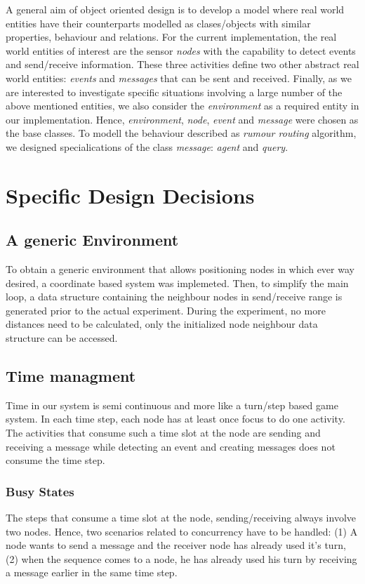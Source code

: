 \documentclass[a4paper,11pt,twoside]{article}
\begin{document}
A general aim of object oriented design is to develop a model where
real world entities have their counterparts modelled as clases/objects
with similar properties, behaviour and relations. For the current
implementation, the real world entities of interest are the sensor
\textit{nodes} with the capability to detect events and send/receive
information. These three activities define two other abstract real
world entities: \textit{events} and \textit{messages} that can be sent
and received. Finally, as we are interested to investigate specific
situations involving a large number of the above mentioned entities,
we also consider the \textit{environment} as a required entity in our
implementation. Hence, \textit{environment}, \textit{node},
\textit{event} and \textit{message} were chosen as the base
classes. To modell the behaviour described as \textit{rumour routing} algorithm,
we designed specialications of the class \textit{message}:
\textit{agent} and \textit{query}.

\section{Specific Design Decisions}
\subsection{A generic Environment}
To obtain a generic environment that allows positioning nodes in which
ever way desired, a coordinate based system was implemeted. Then, to
simplify the main loop, a data structure containing the
neighbour nodes in send/receive range is generated prior to the actual
experiment. During the experiment, no more distances need to be
calculated, only the initialized node neighbour data structure can be accessed.

\subsection{Time managment}
Time in our system is semi continuous and more like a turn/step based
game system. In each time step, each node has at least once focus to
do one activity. The activities that consume such a time slot at the
node are sending and receiving a message while detecting an event and
creating messages does not consume the time step.

\subsubsection{Busy States}
The steps that consume a time slot at the node, sending/receiving
always involve two nodes. Hence, two scenarios related to concurrency
have to be handled: (1) A node wants to send a message and the
receiver node has already used it's turn, (2) when the sequence comes
to a node, he has already used his turn by receiving a message earlier
in the same time step.
\end{document}
